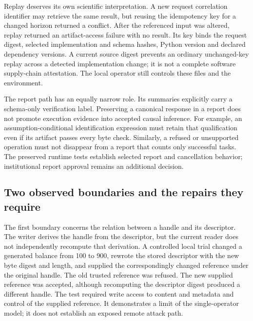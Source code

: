Replay deserves its own scientific interpretation. A new request
correlation identifier may retrieve the same result, but reusing the
idempotency key for a changed horizon returned a conflict. After the
referenced input was altered, replay returned an artifact-access failure
with no result. Its key binds the request digest, selected
implementation and schema hashes, Python version and declared dependency
versions. A current source digest prevents an ordinary unchanged-key
replay across a detected implementation change; it is not a complete
software supply-chain attestation. The local operator still controls
these files and the environment.
\citep{exec14_custody_implementation,exec14_custody_observations}

The report path has an equally narrow role. Its summaries explicitly
carry a schema-only verification label. Preserving a canonical response
in a report does not promote execution evidence into accepted causal
inference. For example, an assumption-conditional identification
expression must retain that qualification even if its artifact passes
every byte check. Similarly, a refused or unsupported operation must not
disappear from a report that counts only successful tasks. The preserved
runtime tests establish selected report and cancellation behavior;
institutional report approval remains an additional
decision.~\citep{exec14_custody_implementation,exec14_custody_observations}

\hypertarget{two-observed-boundaries-and-the-repairs-they-require}{%
\subsection{Two observed boundaries and the repairs they
require}\label{two-observed-boundaries-and-the-repairs-they-require}}

The first boundary concerns the relation between a handle and its
descriptor. The writer derives the handle from the descriptor, but the
current reader does not independently recompute that derivation. A
controlled local trial changed a generated balance from 100 to 900,
rewrote the stored descriptor with the new byte digest and length, and
supplied the correspondingly changed reference under the original
handle. The old trusted reference was refused. The new supplied
reference was accepted, although recomputing the descriptor digest
produced a different handle. The test required write access to content
and metadata and control of the supplied reference. It demonstrates a
limit of the single-operator model; it does not establish an exposed
remote attack path.~\citep{exec14_custody_observations}

